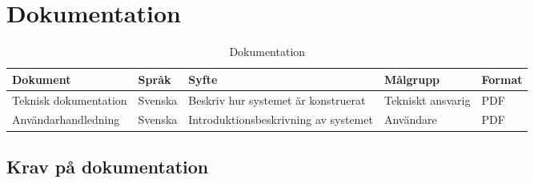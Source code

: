 \section{Dokumentation}

	\begin{table}[h]
	\centering
		\begin{tabularx}{\textwidth}{| l | l | X | l | l |}
			\hline
			\textbf{Dokument} & \textbf{Språk} & \textbf{Syfte} & \textbf{Målgrupp} & \textbf{Format} \\
			\hline
			Teknisk dokumentation & Svenska & Beskriv hur systemet är konstruerat & Tekniskt ansvarig & PDF \\
			\hline
			Användarhandledning & Svenska & Introduktionsbeskrivning av systemet & Användare & PDF \\
			\hline
		\end{tabularx}
	\caption{Dokumentation} \label{dokumentation:tabell}
	\end{table}

\subsection{Krav på dokumentation}
\begin{LIPSkravlista}
\end{LIPSkravlista}
